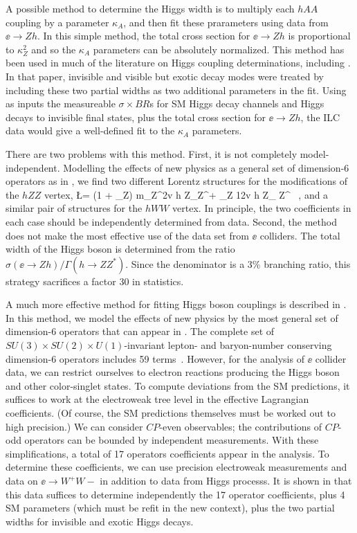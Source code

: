 A possible method to determine the Higgs width is to multiply each $hAA$ coupling by a parameter $\kappa_A$, and then fit these prarameters using data from $\ee\to Zh$.   In this simple method, the total cross section for $\ee\to Zh$ is proportional to $\kappa_Z^2$ and so the $\kappa_A$ parameters can be absolutely normalized.   This method has been used in much of the literature on Higgs coupling determinations, including \cite{Fujii:2015jha}.  In that paper, invisible and visible but exotic decay modes were treated by including these two partial widths as two additional parameters in the fit.  Using as inputs the measureable $\sigma\times BR$s for SM Higgs decay channels and Higgs decays to invisible final states, plus the total cross section for $\ee\to Zh$,  the ILC data would give a well-defined fit to the $\kappa_A$ parameters.

There are two problems with this method.  First, it is not completely model-independent.  Modelling the effects of new physics as a general set of dimension-6 operators as in , we find two different Lorentz structures for the modifications of the $hZZ$ vertex,
\beq
   \Delta \L =    (1 + \eta_Z) {m_Z^2\over v}  h Z_\mu Z^\mu + \zeta_Z {1\over 2v} h
   Z_{\mu\nu} Z^{\mu\nu} \ ,
and a similar pair of structures for the $hWW$ vertex.  In principle, the two coefficients  in each case should be independently determined from data.  Second, the method does not make the most effective use of the data set from $\ee$ colliders.  The total width of the Higgs boson is determined from the ratio  $\sigma(\ee\to Zh)/\Gamma(h\to ZZ^*)$.  Since the denominator is a 3\% branching ratio, this strategy sacrifices a factor 30 in 
statistics.

A much more effective method for fitting Higgs boson couplings is described in \cite{Barklow:2017suo}.   In this method, we model the effects of new physics by the most general set of dimension-6 operators that can appear in .  The complete set of $SU(3)\times SU(2)\times U(1)$-invariant lepton- and baryon-number conserving dimension-6 operators  includes 59 terms~\cite{Grzadkowski:2010es}.  However, for 
the analysis of $\ee$ collider data, we can restrict ourselves to electron reactions 
producing the Higgs boson and other color-singlet states. To compute deviations from the SM predictions, it suffices to work at the electroweak tree level in the effective Lagrangian coefficients. (Of course, the SM predictions themselves must be worked out to high precision.)   We can consider $CP$-even observables; the contributions of $CP$-odd operators can be bounded by independent measurements.   With these simplifications, a total of 17 operators coefficients appear in the analysis.   To determine these coefficients, we can use precision electroweak measurements and data on $\ee\to W^+W-$ in addition to data from Higgs processs.   It is shown in 
\cite{Barklow:2017suo} that this data suffices to determine independently  the 17 operator coefficients, plus 4 SM parameters (which must be refit in the new context), plus the two partial widths for invisible and exotic Higgs decays. 



